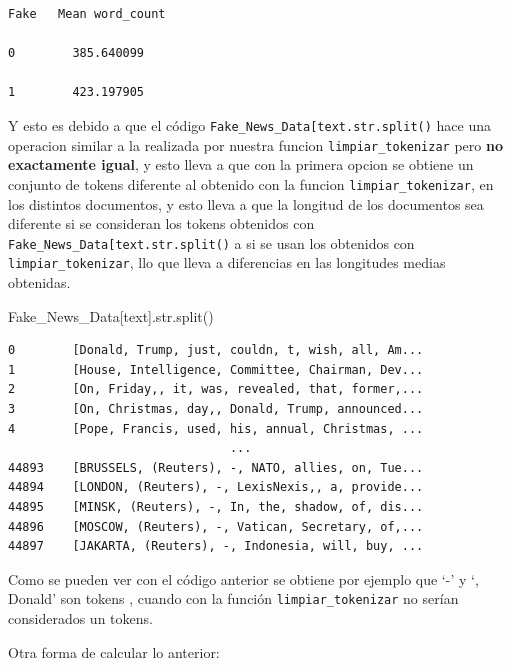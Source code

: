\documentclass[
  11pt,
  a4paper,
]{article}
\newenvironment{Shaded}{\begin{snugshade}}{\end{snugshade}}
\newcommand{\BuiltInTok}[1]{#1}
\newcommand{\NormalTok}[1]{#1}
\newcommand{\StringTok}[1]{\textcolor[rgb]{0.31,0.60,0.02}{#1}}
\begin{document}
\begin{verbatim}
Fake   Mean word_count
    
0        385.640099
    
1        423.197905
\end{verbatim}

Y esto es debido a que el código
\texttt{Fake\_News\_Data{[}\textquotesingle{}text\textquotesingle{}{]}.str.split()}
hace una operacion similar a la realizada por nuestra funcion
\texttt{limpiar\_tokenizar} pero \textbf{no exactamente igual}, y esto
lleva a que con la primera opcion se obtiene un conjunto de tokens
diferente al obtenido con la funcion \texttt{limpiar\_tokenizar}, en los
distintos documentos, y esto lleva a que la longitud de los documentos
sea diferente si se consideran los tokens obtenidos con
\texttt{Fake\_News\_Data{[}\textquotesingle{}text\textquotesingle{}{]}.str.split()}
a si se usan los obtenidos con \texttt{limpiar\_tokenizar}, llo que
lleva a diferencias en las longitudes medias obtenidas.

\begin{Shaded}
\begin{Highlighting}[]
\NormalTok{Fake\_News\_Data[}\StringTok{\textquotesingle{}text\textquotesingle{}}\NormalTok{].}\BuiltInTok{str}\NormalTok{.split()}
\end{Highlighting}
\end{Shaded}

\begin{verbatim}
0        [Donald, Trump, just, couldn, t, wish, all, Am...
1        [House, Intelligence, Committee, Chairman, Dev...
2        [On, Friday,, it, was, revealed, that, former,...
3        [On, Christmas, day,, Donald, Trump, announced...
4        [Pope, Francis, used, his, annual, Christmas, ...
                               ...                        
44893    [BRUSSELS, (Reuters), -, NATO, allies, on, Tue...
44894    [LONDON, (Reuters), -, LexisNexis,, a, provide...
44895    [MINSK, (Reuters), -, In, the, shadow, of, dis...
44896    [MOSCOW, (Reuters), -, Vatican, Secretary, of,...
44897    [JAKARTA, (Reuters), -, Indonesia, will, buy, ...
\end{verbatim}

Como se pueden ver con el código anterior se obtiene por ejemplo que `-'
y `, Donald' son tokens , cuando con la función
\texttt{limpiar\_tokenizar} no serían considerados un tokens.

\vspace{0.5cm}

Otra forma de calcular lo anterior:
\end{document}
